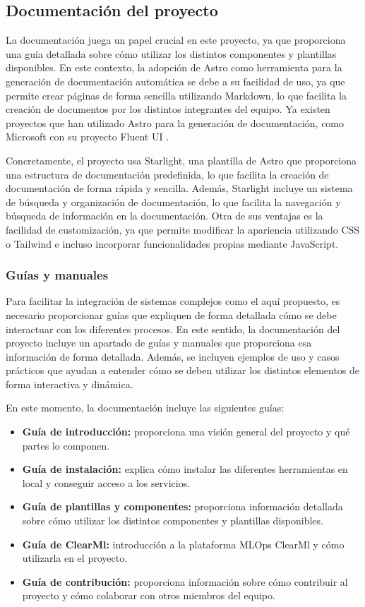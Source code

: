 \subsection{Documentación del proyecto}
La documentación juega un papel crucial en este proyecto, ya 
que proporciona una guía detallada sobre cómo utilizar los distintos 
componentes y plantillas disponibles. En este contexto, la adopción 
de Astro \cite{Astro} como herramienta para la generación de documentación
automática se debe a su facilidad de uso, ya que permite crear
páginas de forma sencilla utilizando Markdown, lo que facilita la
creación de documentos por los distintos integrantes del equipo.
Ya existen proyectos que han utilizado Astro para la generación
de documentación, como Microsoft con su proyecto Fluent UI 
\cite{astroPagesHalf}.\medskip

Concretamente, el proyecto usa Starlight, una plantilla de Astro que
proporciona una estructura de documentación predefinida, lo que
facilita la creación de documentación de forma rápida y sencilla.
Además, Starlight incluye un sistema de búsqueda y organización
de documentación, lo que facilita la navegación y búsqueda de
información en la documentación. Otra de sus ventajas es la
facilidad de customización, ya que permite modificar la apariencia
utilizando CSS o Tailwind e incluso incorporar funcionalidades
propias mediante JavaScript.

\subsubsection{Guías y manuales}
Para facilitar la integración de sistemas complejos como el aquí
propuesto, es necesario proporcionar guías que expliquen
de forma detallada cómo se debe interactuar con los diferentes
procesos. En este sentido, la documentación del proyecto incluye
un apartado de guías y manuales que proporciona esa información
de forma detallada. Además, se incluyen ejemplos de uso y casos
prácticos que ayudan a entender cómo se deben utilizar los distintos
elementos de forma interactiva y dinámica.\medskip

En este momento, la documentación incluye las siguientes guías:
\begin{itemize}
    \item \textbf{Guía de introducción:} proporciona una visión general del
    proyecto y qué partes lo componen.
    \item \textbf{Guía de instalación:} explica cómo instalar las diferentes 
    herramientas en local y conseguir acceso a los servicios. 
    \item \textbf{Guía de plantillas y componentes:} proporciona información detallada sobre cómo
    utilizar los distintos componentes y plantillas disponibles.
    \item \textbf{Guía de ClearMl:} introducción a la plataforma MLOps ClearMl y cómo
    utilizarla en el proyecto.
    \item \textbf{Guía de contribución:} proporciona información sobre cómo
    contribuir al proyecto y cómo colaborar con otros miembros del
    equipo.
\end{itemize}

